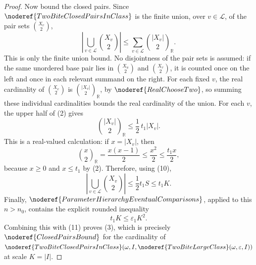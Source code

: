 \begin{proof}
Now bound the closed pairs.  Since
\(\noderef{TwoBiteClosedPairsInClass}\) is the finite union, over
\(v\in\mathcal L\), of the pair sets \(\binom{X_v}{2}\),
\[
\left|\bigcup_{v\in\mathcal L}\binom{X_v}{2}\right|
\le
\sum_{v\in\mathcal L}\binom{|X_v|}{2}_{\mathbb R}.
\]
This is only the finite union bound.  No disjointness of the pair sets is
assumed: if the same unordered base pair lies in \(\binom{X_u}{2}\) and
\(\binom{X_v}{2}\), it is counted once on the left and once in each relevant
summand on the right.  For each fixed \(v\), the real cardinality of
\(\binom{X_v}{2}\) is \(\binom{|X_v|}{2}_{\mathbb R}\), by
\(\noderef{RealChooseTwo}\), so summing these individual cardinalities bounds
the real cardinality of the union.
For each \(v\), the upper half of (2) gives
\[
\binom{|X_v|}{2}_{\mathbb R}
\le \frac12\,t_1|X_v|.
\]
This is a real-valued calculation: if \(x=|X_v|\), then
\[
\binom{x}{2}_{\mathbb R}=\frac{x(x-1)}2\le\frac{x^2}{2}
\le\frac{t_1x}{2},
\]
because \(x\ge0\) and \(x\le t_1\) by (2).  Therefore, using (10),
\[
\left|\bigcup_{v\in\mathcal L}\binom{X_v}{2}\right|
\le
\frac12t_1S
\le t_1K. \tag{11}
\]
Finally, \(\noderef{ParameterHierarchyEventualComparisons}\), applied to this
\(n>n_0\), contains the explicit rounded inequality
\[
t_1K\le\varepsilon_1K^2.
\]
Combining this with (11) proves (3), which is precisely
\(\noderef{ClosedPairsBound}\) for the cardinality of
\(\noderef{TwoBiteClosedPairsInClass}(\omega,I,
\noderef{TwoBiteLargeClass}(\omega,\varepsilon,I))\) at scale \(K=|I|\).
\end{proof}
